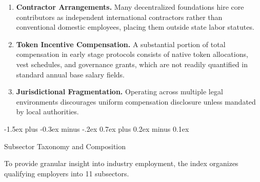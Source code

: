 \documentclass{article}
\makeatletter
\renewcommand\section{\@startsection {section}{1}{\z@}%
  {-1.5ex plus -0.3ex minus -.2ex}%
  {0.7ex plus 0.2ex minus 0.1ex}%
  {\large\bfseries\raggedright}}
\makeatother
\begin{document}
\begin{enumerate}
\item \textbf{Contractor Arrangements.} Many decentralized foundations hire core contributors as independent international contractors rather than conventional domestic employees, placing them outside state labor statutes.
\item \textbf{Token Incentive Compensation.} A substantial portion of total compensation in early stage protocols consists of native token allocations, vest schedules, and governance grants, which are not readily quantified in standard annual base salary fields.
\item \textbf{Jurisdictional Fragmentation.} Operating across multiple legal environments discourages uniform compensation disclosure unless mandated by local authorities.
\end{enumerate}

\section{Subsector Taxonomy and Composition}

To provide granular insight into industry employment, the index organizes qualifying employers into 11 subsectors.
\end{document}
